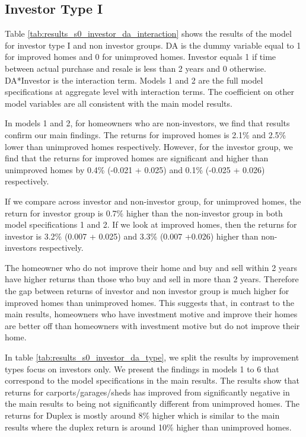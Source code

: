 \documentclass{article}
\begin{document}
\subsection{Investor Type I}

Table \ref{tab:results_s0_investor_da_interaction} shows the results of the model for investor type I and non investor groups. DA is the dummy variable equal to 1 for improved homes and 0 for unimproved homes. Investor equals 1 if time between actual purchase and resale is less than 2 years and 0 otherwise. DA*Investor is the interaction term. Models 1 and 2 are the full model specifications at aggregate level with interaction terms. The coefficient on other model variables are all consistent with the main model results.

In models 1 and 2, for homeowners who are non-investors, we find that results confirm our main findings. The returns for improved homes is 2.1\% and 2.5\% lower than unimproved homes respectively. However, for the investor group, we find that the returns for improved homes are significant and higher than unimproved homes by 0.4\% (-0.021 + 0.025) and 0.1\% (-0.025 + 0.026) respectively.

If we compare across investor and non-investor group, for unimproved homes, the return for investor group is 0.7\% higher than the non-investor group in both model specifications 1 and 2. If we look at improved homes, then the returns for investor is 3.2\% (0.007 + 0.025) and 3.3\% (0.007 +0.026) higher than non-investors respectively.

The homeowner who do not improve their home and buy and sell within 2 years have higher returns than those who buy and sell in more than 2 years. Therefore the gap between returns of investor and non investor group is much higher for improved homes than unimproved homes. This suggests that, in contrast to the main results, homeowners who have investment motive and improve their homes are better off than homeowners with investment motive but do not improve their home.

In table \ref{tab:results_s0_investor_da_type}, we split the results by improvement types focus on investors only. We present the findings in models 1 to 6 that correspond to the model specifications in the main results. The results show that returns for carports/garages/sheds has improved from significantly negative in the main results to being not significantly different from unimproved homes. The returns for Duplex is mostly around 8\% higher which is similar to the main results where the duplex return is around 10\% higher than unimproved homes. 
\end{document}
